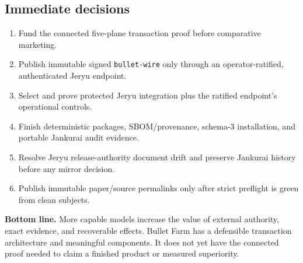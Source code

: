 \documentclass[11pt,letterpaper]{article}
\newcommand{\statusbox}[1]{\colorbox{blue!8}{\parbox{.96\linewidth}{#1}}}
\newenvironment{tightenum}{\setlength{\topsep}{1pt}\setlength{\partopsep}{0pt}\begin{enumerate}\setlength{\itemsep}{1pt}\setlength{\parskip}{0pt}\setlength{\parsep}{0pt}}{\end{enumerate}}
\begin{document}
\subsection*{Immediate decisions}

\begin{tightenum}
\item Fund the connected five-plane transaction proof before comparative marketing.
\item Publish immutable signed \texttt{bullet-wire} only through an operator-ratified, authenticated Jeryu endpoint.
\item Select and prove protected Jeryu integration plus the ratified endpoint's operational controls.
\item Finish deterministic packages, SBOM/provenance, schema-3 installation, and portable Jankurai audit evidence.
\item Resolve Jeryu release-authority document drift and preserve Jankurai history before any mirror decision.
\item Publish immutable paper/source permalinks only after strict preflight is green from clean subjects.
\end{tightenum}

\vfill
\statusbox{\textbf{Bottom line.} More capable models increase the value of
external authority, exact evidence, and recoverable effects. Bullet Farm has a
defensible transaction architecture and meaningful components. It does not yet
have the connected proof needed to claim a finished product or measured
superiority.}
\end{document}

